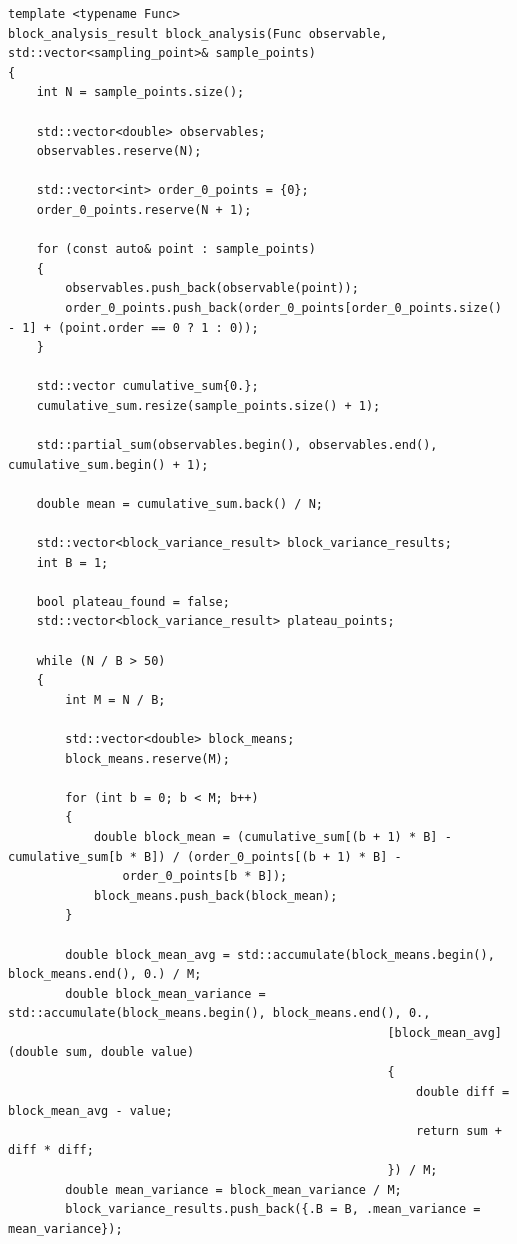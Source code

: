 \documentclass[a4paper, 11pt]{article}          %
\begin{document}
\begin{landscape}
    \begin{lstlisting}[style=cppstyle, caption={Block analysis as described in \ref{sec:task4}. This calculates the mean and also the variance by gradually increasing block sizes and calculating the variance of the block means. A cumulative sum is used so that block means turn from a sum over B values into just one subtraction}, label={lst:block-analysis}]
template <typename Func>
block_analysis_result block_analysis(Func observable, std::vector<sampling_point>& sample_points)
{
    int N = sample_points.size();

    std::vector<double> observables;
    observables.reserve(N);

    std::vector<int> order_0_points = {0};
    order_0_points.reserve(N + 1);

    for (const auto& point : sample_points)
    {
        observables.push_back(observable(point));
        order_0_points.push_back(order_0_points[order_0_points.size() - 1] + (point.order == 0 ? 1 : 0));
    }

    std::vector cumulative_sum{0.};
    cumulative_sum.resize(sample_points.size() + 1);

    std::partial_sum(observables.begin(), observables.end(), cumulative_sum.begin() + 1);

    double mean = cumulative_sum.back() / N;

    std::vector<block_variance_result> block_variance_results;
    int B = 1;

    bool plateau_found = false;
    std::vector<block_variance_result> plateau_points;

    while (N / B > 50)
    {
        int M = N / B;

        std::vector<double> block_means;
        block_means.reserve(M);

        for (int b = 0; b < M; b++)
        {
            double block_mean = (cumulative_sum[(b + 1) * B] - cumulative_sum[b * B]) / (order_0_points[(b + 1) * B] -
                order_0_points[b * B]);
            block_means.push_back(block_mean);
        }

        double block_mean_avg = std::accumulate(block_means.begin(), block_means.end(), 0.) / M;
        double block_mean_variance = std::accumulate(block_means.begin(), block_means.end(), 0.,
                                                     [block_mean_avg](double sum, double value)
                                                     {
                                                         double diff = block_mean_avg - value;
                                                         return sum + diff * diff;
                                                     }) / M;
        double mean_variance = block_mean_variance / M;
        block_variance_results.push_back({.B = B, .mean_variance = mean_variance});


\end{lstlisting}
\end{landscape}
\end{document}
